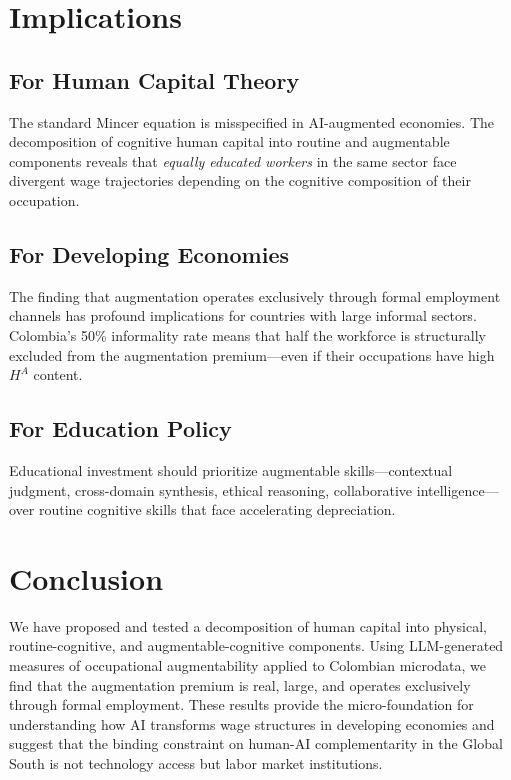\documentclass[12pt,a4paper]{article}
\begin{document}
\section{Implications}
\label{sec:implications}

\subsection{For Human Capital Theory}

The standard Mincer equation is misspecified in AI-augmented economies. The decomposition of cognitive human capital into routine and augmentable components reveals that \textit{equally educated workers} in the same sector face divergent wage trajectories depending on the cognitive composition of their occupation.

\subsection{For Developing Economies}

The finding that augmentation operates exclusively through formal employment channels has profound implications for countries with large informal sectors. Colombia's 50\% informality rate means that half the workforce is structurally excluded from the augmentation premium---even if their occupations have high $H^A$ content.

\subsection{For Education Policy}

Educational investment should prioritize augmentable skills---contextual judgment, cross-domain synthesis, ethical reasoning, collaborative intelligence---over routine cognitive skills that face accelerating depreciation.


\section{Conclusion}
\label{sec:conclusion}

We have proposed and tested a decomposition of human capital into physical, routine-cognitive, and augmentable-cognitive components. Using LLM-generated measures of occupational augmentability applied to Colombian microdata, we find that the augmentation premium is real, large, and operates exclusively through formal employment. These results provide the micro-foundation for understanding how AI transforms wage structures in developing economies and suggest that the binding constraint on human-AI complementarity in the Global South is not technology access but labor market institutions.

\bigskip
\singlespacing


\end{document}
